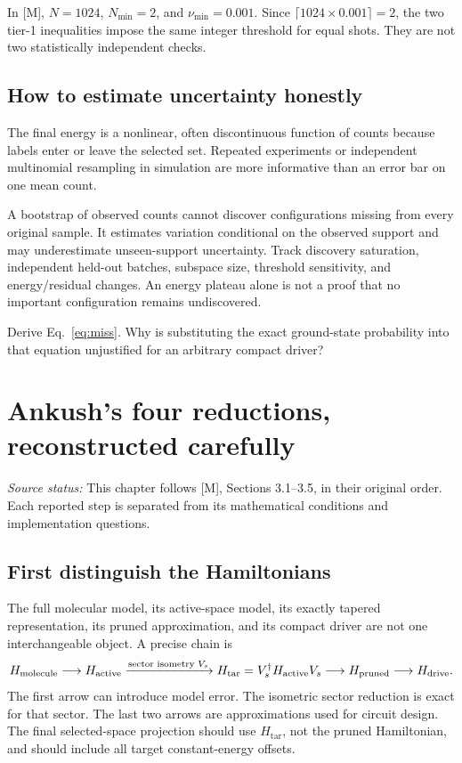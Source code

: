 \documentclass[11pt,a4paper,oneside]{report}
\newcommand{\Ht}{H_{\mathrm{tar}}}
\newcommand{\Hd}{H_{\mathrm{drive}}}
\newcommand{\src}[1]{\par{\small\color{grey}\textit{Source status:} #1}\par}
\newcommand{\checkpoint}[1]{\begin{idea}[Check your understanding]#1\end{idea}}
\begin{document}
In [M], $N=1024$, $N_{\min}=2$, and $\nu_{\min}=0.001$. Since $\lceil1024\times0.001\rceil=2$, the two tier-1 inequalities impose the same integer threshold for equal shots. They are not two statistically independent checks.

\section{How to estimate uncertainty honestly}
The final energy is a nonlinear, often discontinuous function of counts because labels enter or leave the selected set. Repeated experiments or independent multinomial resampling in simulation are more informative than an error bar on one mean count.

A bootstrap of observed counts cannot discover configurations missing from every original sample. It estimates variation conditional on the observed support and may underestimate unseen-support uncertainty. Track discovery saturation, independent held-out batches, subspace size, threshold sensitivity, and energy/residual changes. An energy plateau alone is not a proof that no important configuration remains undiscovered.

\checkpoint{Derive Eq.~\eqref{eq:miss}. Why is substituting the exact ground-state probability into that equation unjustified for an arbitrary compact driver?}

\chapter{Ankush's four reductions, reconstructed carefully}\label{ch:reductions}
\src{This chapter follows [M], Sections 3.1--3.5, in their original order. Each reported step is separated from its mathematical conditions and implementation questions.}

\section{First distinguish the Hamiltonians}
The full molecular model, its active-space model, its exactly tapered representation, its pruned approximation, and its compact driver are not one interchangeable object. A precise chain is
\begin{equation}
H_{\rm molecule}\longrightarrow H_{\rm active}
\xrightarrow{\text{sector isometry }V_s}\Ht=V_s^\dagger H_{\rm active}V_s
\longrightarrow H_{\rm pruned}\longrightarrow\Hd.
\end{equation}
The first arrow can introduce model error. The isometric sector reduction is exact for that sector. The last two arrows are approximations used for circuit design. The final selected-space projection should use $\Ht$, not the pruned Hamiltonian, and should include all target constant-energy offsets.
\end{document}
